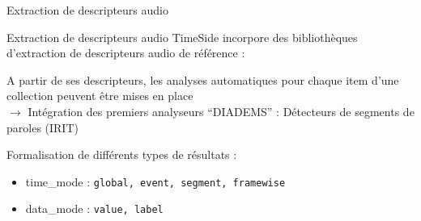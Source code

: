 \documentclass[10pt, final, hyperref, table]{beamer}
\begin{document}
\begin{frame}{Extraction de descripteurs audio}
  
 \begin{block}{Extraction de descripteurs audio}
TimeSide incorpore des bibliothèques d'extraction de descripteurs audio de référence :
\vspace{-0.1cm}
\alert{A partir de ses descripteurs, les analyses automatiques pour chaque item d'une collection peuvent être mises en place}\\
$\longrightarrow$ Intégration des premiers analyseurs ``DIADEMS'' : Détecteurs de segments de paroles (IRIT) 

\end{block}
\begin{block}{}
  Formalisation de différents types de résultats :
  \begin{itemize}
  \item time\_mode : \texttt{global, event, segment, framewise}
  \item data\_mode : \texttt{value, label}
  \end{itemize}
\end{block}
\end{frame}
\end{document}
